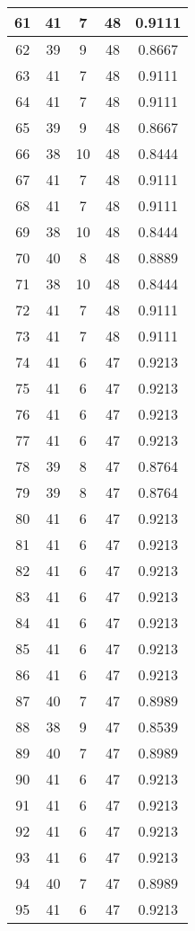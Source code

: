 \documentclass[letterpaper, 12pt]{article}
\begin{document}
\begin{longtable}{|c|c|c|c|c|}
61 & 41 & 7 & 48 & 0.9111 \\
\hline
62 & 39 & 9 & 48 & 0.8667 \\
\hline
63 & 41 & 7 & 48 & 0.9111 \\
\hline
64 & 41 & 7 & 48 & 0.9111 \\
\hline
65 & 39 & 9 & 48 & 0.8667 \\
\hline
66 & 38 & 10 & 48 & 0.8444 \\
\hline
67 & 41 & 7 & 48 & 0.9111 \\
\hline
68 & 41 & 7 & 48 & 0.9111 \\
\hline
69 & 38 & 10 & 48 & 0.8444 \\
\hline
70 & 40 & 8 & 48 & 0.8889 \\
\hline
71 & 38 & 10 & 48 & 0.8444 \\
\hline
72 & 41 & 7 & 48 & 0.9111 \\
\hline
73 & 41 & 7 & 48 & 0.9111 \\
\hline
74 & 41 & 6 & 47 & 0.9213 \\
\hline
75 & 41 & 6 & 47 & 0.9213 \\
\hline
76 & 41 & 6 & 47 & 0.9213 \\
\hline
77 & 41 & 6 & 47 & 0.9213 \\
\hline
78 & 39 & 8 & 47 & 0.8764 \\
\hline
79 & 39 & 8 & 47 & 0.8764 \\
\hline
80 & 41 & 6 & 47 & 0.9213 \\
\hline
81 & 41 & 6 & 47 & 0.9213 \\
\hline
82 & 41 & 6 & 47 & 0.9213 \\
\hline
83 & 41 & 6 & 47 & 0.9213 \\
\hline
84 & 41 & 6 & 47 & 0.9213 \\
\hline
85 & 41 & 6 & 47 & 0.9213 \\
\hline
86 & 41 & 6 & 47 & 0.9213 \\
\hline
87 & 40 & 7 & 47 & 0.8989 \\
\hline
88 & 38 & 9 & 47 & 0.8539 \\
\hline
89 & 40 & 7 & 47 & 0.8989 \\
\hline
90 & 41 & 6 & 47 & 0.9213 \\
\hline
91 & 41 & 6 & 47 & 0.9213 \\
\hline
92 & 41 & 6 & 47 & 0.9213 \\
\hline
93 & 41 & 6 & 47 & 0.9213 \\
\hline
94 & 40 & 7 & 47 & 0.8989 \\
\hline
95 & 41 & 6 & 47 & 0.9213 \\

\end{longtable}
\end{document}

